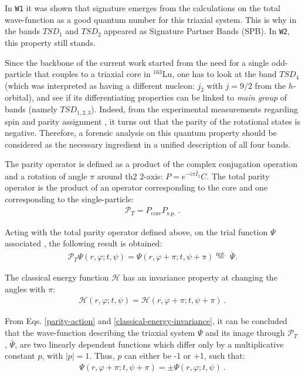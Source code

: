 \documentclass[11pt]{article}
\begin{document}
In \texttt{W1} it was shown that signature emerges from the calculations on the total wave-function as a good quantum number for this triaxial system. This is why in \cite{raduta2020approach} the bands $TSD_1$ and $TSD_2$ appeared as Signature Partner Bands (SPB). In \texttt{W2}, this property still stands.

Since the backbone of the current work started from the need for a single odd-particle that couples to a triaxial core in $^{163}$Lu, one has to look at the band $TSD_4$ (which was interpreted as having a different nucleon: $j_2$ with $j=9/2$ from the $h$-orbital), and see if its differentiating properties can be linked to \emph{main group} of bands (namely $TSD_{1,2,3}$). Indeed, from the experimental measurements regarding spin and parity assignment \cite{jensen2004coexisting}, it turns out that the parity of the rotational states is negative. Therefore, a forensic analysis on this quantum property should be considered as the necessary ingredient in a unified description of all four bands.

 The parity operator is defined as a product of the complex conjugation operation and a rotation of angle $\pi$ around th2 2-axis: $P=e^{-i\pi\hat{I}_2}C$. The total parity operator is  the product of an operator corresponding to the core and one corresponding to the single-particle:
\begin{align}
    \mathcal{P}_T=P_\text{core}P_\text{s.p.}\ .
    \label{parity-operator}
\end{align}

Acting with the total parity operator defined above, on the trial function $\Psi$ associated , the following result is obtained:
\begin{align}
    \mathcal{P}_T\Psi(r,\varphi;t,\psi)=\Psi(r,\varphi+\pi;t,\psi+\pi)\overset{\mathrm{not.}}{=}\ \bar{\Psi}.
    \label{parity-action}
\end{align}

The classical energy function $\mathcal{H}$ has an invariance property at changing the angles with $\pi$:
\begin{align}
    \mathcal{H}(r,\varphi;t,\psi)=\mathcal{H}(r,\varphi+\pi;t,\psi+\pi)\ .
    \label{classical-energy-invariance}
\end{align}

From Eqs. \ref{parity-action} and \ref{classical-energy-invariance}, it can be concluded that the wave-function describing the triaxial system $\Psi$ and its image through $\mathcal{P}_T$ , $\bar{\Psi}$,  are two linearly dependent functions which differ only by a multiplicative constant $p$, with $|p|=1$. Thus, $p$ can either be -1 or +1, such that:
\begin{align}
    \Psi(r,\varphi+\pi;t,\psi+\pi)=\pm\Psi(r,\varphi;t,\psi)\ .
\end{align}
\end{document}
